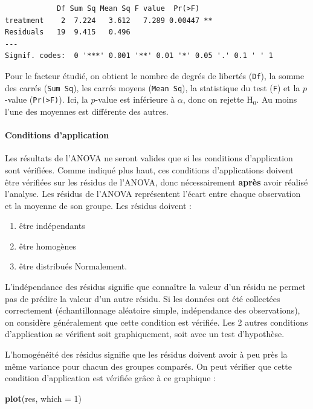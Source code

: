 \documentclass[a4paperpaper,]{article}
\newenvironment{Shaded}{\begin{snugshade}}{\end{snugshade}}
\newcommand{\DataTypeTok}[1]{\textcolor[rgb]{0.00,0.34,0.68}{#1}}
\newcommand{\DecValTok}[1]{\textcolor[rgb]{0.69,0.50,0.00}{#1}}
\newcommand{\KeywordTok}[1]{\textcolor[rgb]{0.12,0.11,0.11}{\textbf{#1}}}
\newcommand{\NormalTok}[1]{\textcolor[rgb]{0.12,0.11,0.11}{#1}}
\providecommand{\tightlist}{%
  \setlength{\itemsep}{0pt}\setlength{\parskip}{0pt}}
\let\oldparagraph\paragraph
\renewcommand{\paragraph}[1]{\oldparagraph{#1}\mbox{}}
\begin{document}
\begin{verbatim}
            Df Sum Sq Mean Sq F value  Pr(>F)   
treatment    2  7.224   3.612   7.289 0.00447 **
Residuals   19  9.415   0.496                   
---
Signif. codes:  0 '***' 0.001 '**' 0.01 '*' 0.05 '.' 0.1 ' ' 1
\end{verbatim}

Pour le facteur étudié, on obtient le nombre de degrés de libertés (\texttt{Df}), la somme des carrés (\texttt{Sum\ Sq}), les carrés moyens (\texttt{Mean\ Sq}), la statistique du test (\texttt{F}) et la \(p\)-value (\texttt{Pr(\textgreater{}F)}). Ici, la \(p\)-value est inférieure à \(\alpha\), donc on rejette H\(_0\). Au moins l'une des moyennes est différente des autres.

\hypertarget{CAANOVA}{%
\paragraph{Conditions d'application}\label{CAANOVA}}

Les résultats de l'ANOVA ne seront valides que si les conditions d'application sont vérifiées. Comme indiqué plus haut, ces conditions d'applications doivent être vérifiées sur les résidus de l'ANOVA, donc nécessairement \textbf{après} avoir réalisé l'analyse. Les résidus de l'ANOVA représentent l'écart entre chaque observation et la moyenne de son groupe. Les résidus doivent :

\begin{enumerate}
\def\labelenumi{\arabic{enumi}.}
\tightlist
\item
  être indépendants
\item
  être homogènes
\item
  être distribués Normalement.
\end{enumerate}

L'indépendance des résidus signifie que connaître la valeur d'un résidu ne permet pas de prédire la valeur d'un autre résidu. Si les données ont été collectées correctement (échantillonnage aléatoire simple, indépendance des observations), on considère généralement que cette condition est vérifiée. Les 2 autres conditions d'application se vérifient soit graphiquement, soit avec un test d'hypothèse.

L'homogénéité des résidus signifie que les résidus doivent avoir à peu près la même variance pour chacun des groupes comparés. On peut vérifier que cette condition d'application est vérifiée grâce à ce graphique :

\begin{Shaded}
\begin{Highlighting}[]
\KeywordTok{plot}\NormalTok{(res, }\DataTypeTok{which =} \DecValTok{1}\NormalTok{)}
\end{Highlighting}
\end{Shaded}
\end{document}
